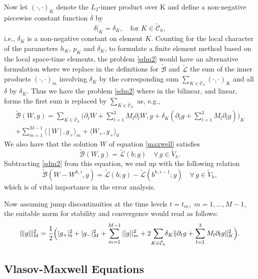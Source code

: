 \documentclass[reqno,a4paper]{amsart}
\theoremstyle{remark}
\numberwithin{equation}{section}
\newcommand{\Mnorm}[1]{|\mkern-1mu|\mkern-1mu|#1|\mkern-1mu|\mkern-1mu|_\mathrm{M}}
\newcommand{\sprod}[2]{\langle #1, #2 \rangle}
\def\d{\partial}
\def\Bt{\tilde{\mathcal{B}}}
\def\Lt{\tilde{\mathcal{L}}}
\def\sumK{\sum_{K\in\mathcal{\tilde{C}}_h}\!\!}
\begin{document}
Now let $(\cdot,\cdot)_K$ denote the $L_2$-inner product over K
and define a non-negative piecewise constant function $\delta$ by
$$
\delta|_K=\delta_K, \quad \mbox{for } K\in\mathcal{\tilde{C}}_h,
$$
i.e.,  $\delta_K$ is a non-negative constant on element $K$.
Counting for the local character of the parameters $h_K$, $p_K$ and $\delta_K$,
to formulate a finite element method based on the local 
space-time elements, the problem 
 \eqref{sdm2} would have an alternative formulation where we 
replace in the definitions
for $\Bt$ and $\Lt$ the sum of the inner products $(\cdot,\cdot)_m$
involving $\delta_K$ by the corresponding sum $\sumK{}(\cdot,\cdot)_K$
and all $\delta$ by $\delta_K$.
Thus we have the problem \eqref{sdm2} where in the bilinear, and linear,
 forms the first sum is replaced by $\sum_{K\in\tilde{\mathcal C}_h}$ 
as, e.g.,  
\begin{multline*}
\Bt(W,g)=\sumK \Big(\d_t W + \sum_{l=1}^3 M_l\d_l W,
g + \delta_K (\d_t g + \sum_{l=1}^3 M_l\d_l g)\Big)_K \\
+ \sum_{m=1}^{M-1} \sprod{[ W ]}{g_+}_m + \sprod{W_+}{g_+}_0
\end{multline*}
We also have that the solution $W$ of equation \eqref{maxwell} satisfies
$$
\Bt(W, g) = \Lt(b;g) \quad \forall \, g \in \tilde{V}_h.
$$
Subtracting \eqref{sdm2} from this equation,
we end up with the following relation 
\begin{equation} \label{ortomax}
\Bt (W-W^{h,i} , g) = \Lt (b;g) -\Lt (b^{h,i-1}; g) 
\quad \forall \, g \in \tilde{V}_h,
\end{equation}
which is of vital importance in the error analysis.

Now assuming jump discontinuities at the time levels 
$t=t_m,\, \,m=1,\ldots, M-1$, the suitable norm for 
 stability and convergence would read as follows: 
$$
\Mnorm{g}^2 = \frac{1}{2} 
\Big( | g_+ |^2_0 + | g_- |^2_M+\sum_{m=1}^{M-1} |[g]|^2_m
+2\!\sumK\delta_K\|\d_t g+\sum_{l=1}^3 M_l\d_l g\|_K^2 \Big).
$$


\subsection{Vlasov-Maxwell Equations}
\end{document}
